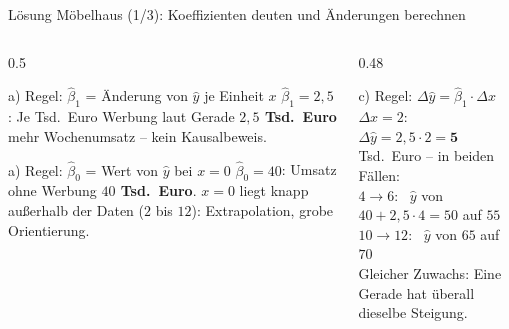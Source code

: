 \documentclass[aspectratio=169,11pt]{beamer}
\begin{document}
\begin{frame}{Lösung Möbelhaus (1/3): Koeffizienten deuten und Änderungen berechnen}
  \small

  \begin{columns}[T]
    \begin{column}{0.5\textwidth}
      \begin{block}{a) Regel: $\hat{\beta}_1$ = Änderung von $\hat{y}$ je Einheit $x$}
        $\hat{\beta}_1 = 2{,}5$: Je Tsd.~Euro Werbung laut Gerade \textbf{$2{,}5$ Tsd.~Euro} mehr
        Wochenumsatz -- kein Kausalbeweis.
      \end{block}
      \begin{block}{a) Regel: $\hat{\beta}_0$ = Wert von $\hat{y}$ bei $x = 0$}
        $\hat{\beta}_0 = 40$: Umsatz ohne Werbung \textbf{$40$ Tsd.~Euro}. $x = 0$ liegt knapp
        außerhalb der Daten ($2$ bis $12$): Extrapolation, grobe Orientierung.
      \end{block}
    \end{column}
    \begin{column}{0.48\textwidth}
      \begin{exampleblock}{c) Regel: $\Delta \hat{y} = \hat{\beta}_1 \cdot \Delta x$}
        $\Delta x = 2$: \ $\Delta \hat{y} = 2{,}5 \cdot 2 = \mathbf{5}$ Tsd.~Euro -- in beiden Fällen:\\[2pt]
        $4 \to 6$: \ $\hat{y}$ von $40 + 2{,}5 \cdot 4 = 50$ auf $55$\\
        $10 \to 12$: \ $\hat{y}$ von $65$ auf $70$\\[2pt]
        Gleicher Zuwachs: Eine Gerade hat überall dieselbe Steigung.
      \end{exampleblock}
    \end{column}
  \end{columns}
\end{frame}
\end{document}
